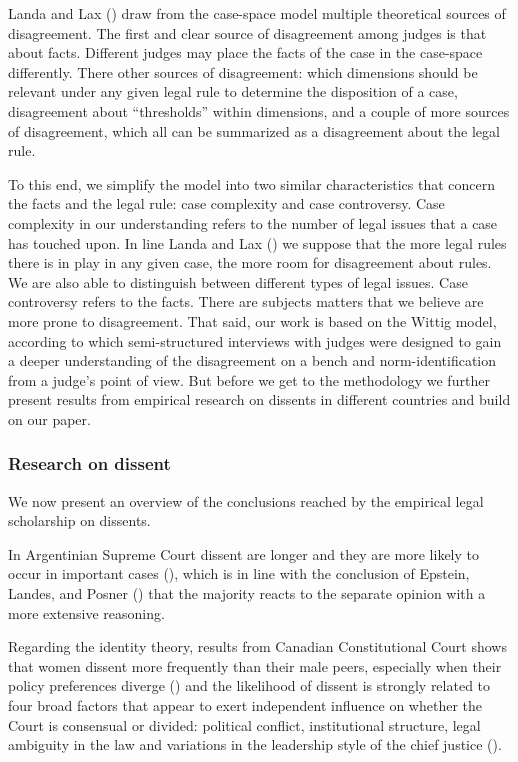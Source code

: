 \documentclass[
  11pt,
]{article}
\begin{document}
Landa and Lax () draw from the case-space model multiple theoretical sources of disagreement. The first and clear source of disagreement among judges is that about facts. Different judges may place the facts of the case in the case-space differently. There other sources of disagreement: which dimensions should be relevant under any given legal rule to determine the disposition of a case, disagreement about ``thresholds'' within dimensions, and a couple of more sources of disagreement, which all can be summarized as a disagreement about the legal rule.

To this end, we simplify the model into two similar characteristics that concern the facts and the legal rule: case complexity and case controversy. Case complexity in our understanding refers to the number of legal issues that a case has touched upon. In line Landa and Lax () we suppose that the more legal rules there is in play in any given case, the more room for disagreement about rules. We are also able to distinguish between different types of legal issues. Case controversy refers to the facts. There are subjects matters that we believe are more prone to disagreement.
That said, our work is based on the Wittig model, according to which semi-structured interviews with judges were designed to gain a deeper understanding of the disagreement on a bench and norm-identification from a judge's point of view. But before we get to the methodology we further present results from empirical research on dissents in different countries and build on our paper.

\subsubsection{Research on dissent}\label{research}

We now present an overview of the conclusions reached by the empirical legal scholarship on dissents.

In Argentinian Supreme Court dissent are longer and they are more likely to occur in important cases (), which is in line with the conclusion of Epstein, Landes, and Posner () that the majority reacts to the separate opinion with a more extensive reasoning.

Regarding the identity theory, results from Canadian Constitutional Court shows that women dissent more frequently than their male peers, especially when their policy preferences diverge () and the likelihood of dissent is strongly related to four broad factors that appear to exert independent influence on whether the Court is consensual or divided: political conflict, institutional structure, legal ambiguity in the law and variations in the leadership style of the chief justice ().
\end{document}
